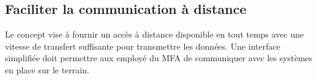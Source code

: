 

\subsection{Faciliter la communication à distance}
\label{s:beo_obj_distance}

Le concept vise à fournir un accès à distance disponible en tout temps avec une vitesse de transfert suffisante pour transmettre les données. Une interface simplifiée doit permettre aux employé du MFA de communiquer avec les systèmes en place sur le terrain.
